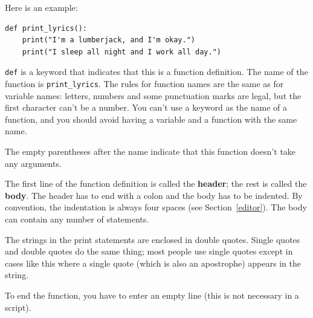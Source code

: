 \documentclass[10pt]{book}
\begin{document}

Here is an example:

\beforeverb
\begin{verbatim}
def print_lyrics():
    print("I'm a lumberjack, and I'm okay.")
    print("I sleep all night and I work all day.")
\end{verbatim}
\afterverb
%
{\tt def} is a keyword that indicates that this is a function
definition.  The name of the function is \verb"print_lyrics".  The
rules for function names are the same as for variable names: letters,
numbers and some punctuation marks are legal, but the first character
can't be a number.  You can't use a keyword as the name of a function,
and you should avoid having a variable and a function with the same
name.


The empty parentheses after the name indicate that this function
doesn't take any arguments.


The first line of the function definition is called the {\bf header};
the rest is called the {\bf body}.  The header has to end with a colon
and the body has to be indented.  By convention, the indentation is
always four spaces (see Section~\ref{editor}).  The body can contain
any number of statements.

The strings in the print statements are enclosed in double
quotes.  Single quotes and double quotes do the same thing;
most people use single quotes except in cases like this where
a single quote (which is also an apostrophe) appears in the string.

To end the function, you have to enter an empty line (this is
not necessary in a script).
\end{document}
